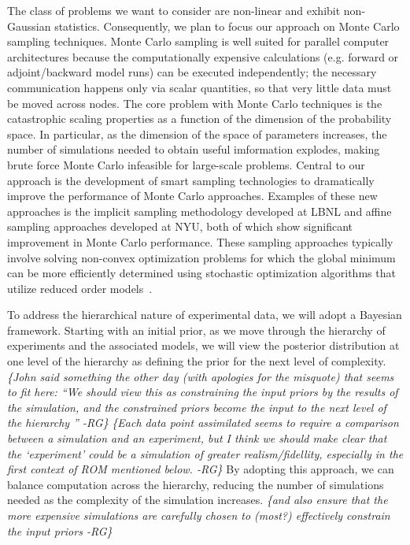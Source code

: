 \documentclass[11pt]{article}
\newcommand{\MarginPar}[1]{\marginpar{%
\vskip-\baselineskip %
\raggedright\tiny\sffamily
\hrule\smallskip{\color{red}#1}\par\smallskip\hrule}}
\newcommand{\remrg}[1]{ {\it \color{drkgrn} \{#1 -RG\}}}
\begin{document}
The class of problems we want to consider are non-linear and exhibit non-Gaussian statistics.
Consequently, we plan to focus our approach on Monte Carlo sampling techniques.
Monte Carlo sampling is well suited for parallel computer architectures because the computationally
expensive calculations (e.g. forward or adjoint/backward model runs) can be executed independently;
the necessary communication happens only via scalar quantities, so that very little data must be moved
across nodes.
The core problem with Monte Carlo techniques is the catastrophic scaling properties as a function of the
dimension of the probability space.  In particular, as the dimension of the space of parameters increases,
the number of simulations needed to obtain useful imformation explodes, making brute force Monte Carlo
infeasible for large-scale problems.
Central to our approach is the development of smart sampling technologies to dramatically improve
the performance of Monte Carlo approaches.  Examples of these new approaches is the implicit sampling
\MarginPar{Help needed here}
methodology developed at LBNL 
and affine sampling approaches developed at NYU, both of which show significant improvement
in Monte Carlo performance.  These sampling approaches typically involve solving non-convex optimization problems for which the global minimum can be more efficiently determined using stochastic optimization algorithms that utilize reduced order models~\cite{Regis:2007,Wild:2011uh}. 

To address the hierarchical nature of experimental data, we will adopt a Bayesian framework.  Starting
with an initial prior, as we move through the hierarchy of experiments and the associated models, we will view the posterior distribution at
one level of the hierarchy as defining the prior for the next level of complexity. \remrg{John said something the other day (with apologies for the misquote) that seems to fit here: ``We should view this as constraining the 
  input priors by the results of the simulation, and the constrained priors become the input to the next level of the hierarchy ''} \remrg{Each data point assimilated seems to require a comparison between a simulation and an experiment, but I think we should make clear that the `experiment' could be a simulation of
  greater realism/fidellity, especially in the first context of ROM mentioned below.}  By adopting this
approach, we can balance computation across the hierarchy, reducing the number of simulations needed
as the complexity of the simulation increases.   \remrg{and also ensure that the more expensive simulations
  are carefully chosen to (most?)  effectively constrain the input
  priors} 
\end{document}

